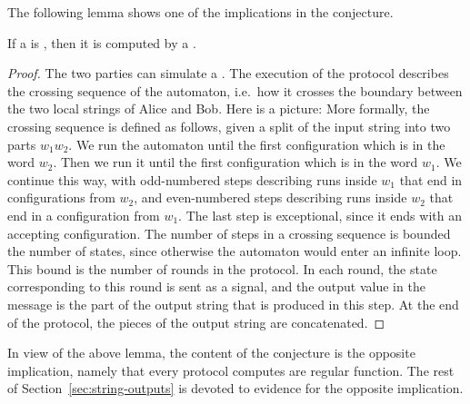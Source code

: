    The following lemma shows one of the implications in the conjecture.

\begin{lemma}\label{lem:from-regular-to-protocol}
    If a  is , 
    then it is computed by a .
\end{lemma}
\begin{proof}
    The two parties can simulate a . The execution
    of the protocol describes the crossing sequence of the automaton, i.e.~how
    it crosses the boundary between the two local strings of Alice and Bob.
    Here is a picture:  More formally, the crossing sequence is
    defined as follows, given  a split of the input string into two parts $w_1
    w_2$. We run the automaton until the first configuration which is in the
    word $w_2$. Then we run it until the first configuration which is in the
    word $w_1$. We continue this way, with odd-numbered steps describing runs
    inside $w_1$ that end in  configurations from $w_2$, and even-numbered
    steps describing runs inside $w_2$ that end in a configuration from $w_1$.
    The last step is exceptional, since it ends with an accepting
    configuration. The number of steps in a crossing sequence is bounded  the
    number of states, since otherwise the automaton would enter an infinite
    loop. This bound is the number of rounds in the protocol. In each round,
    the state corresponding to this round is sent as a signal, and the output
    value in the message is the  part of the output string that is produced in
    this  step. At the end of the protocol, the pieces of the output string are
    concatenated. 
\end{proof}

In view of the above lemma, the content of the conjecture is the opposite
implication, namely that every protocol computes are regular function.  The
rest of Section~\ref{sec:string-outputs} is devoted to  evidence for the
opposite implication.


